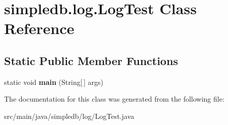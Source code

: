 \hypertarget{classsimpledb_1_1log_1_1LogTest}{}\section{simpledb.\+log.\+Log\+Test Class Reference}
\label{classsimpledb_1_1log_1_1LogTest}
\subsection*{Static Public Member Functions}
\begin{DoxyCompactItemize}
\item 
\mbox{\label{classsimpledb_1_1log_1_1LogTest_aa88be76c06b285fc2509bb7f0bdeb5f7}} 
static void {\bfseries main} (String\mbox{[}$\,$\mbox{]} args)
\end{DoxyCompactItemize}


The documentation for this class was generated from the following file\+:\begin{DoxyCompactItemize}
\item 
src/main/java/simpledb/log/Log\+Test.\+java\end{DoxyCompactItemize}
